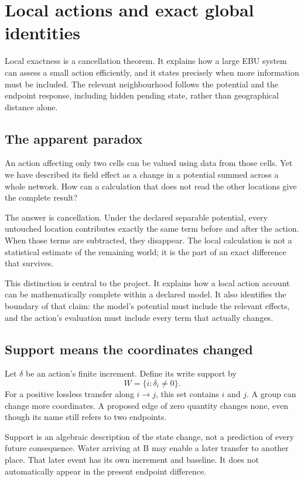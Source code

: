 \chapter{Local actions and exact global identities}\label{ch:locality}

Local exactness is a cancellation theorem. It explains how a large EBU system can assess a small action efficiently, and it states precisely when more information must be included. The relevant neighbourhood follows the potential and the endpoint response, including hidden pending state, rather than geographical distance alone.


\section{The apparent paradox}
An action affecting only two cells can be valued using data from those cells. Yet we have described its field effect as a change in a potential summed across a whole network. How can a calculation that does not read the other locations give the complete result?

The answer is cancellation. Under the declared separable potential, every untouched location contributes exactly the same term before and after the action. When those terms are subtracted, they disappear. The local calculation is not a statistical estimate of the remaining world; it is the part of an exact difference that survives.

This distinction is central to the project. It explains how a local action account can be mathematically complete within a declared model. It also identifies the boundary of that claim: the model's potential must include the relevant effects, and the action's evaluation must include every term that actually changes.

\section{Support means the coordinates changed}
Let $\delta$ be an action's finite increment. Define its write support by
\begin{equation}
 W=\{i:\delta_i\ne0\}.
\end{equation}
For a positive lossless transfer along $i\to j$, this set contains $i$ and $j$. A group can change more coordinates. A proposed edge of zero quantity changes none, even though its name still refers to two endpoints.

Support is an algebraic description of the state change, not a prediction of every future consequence. Water arriving at B may enable a later transfer to another place. That later event has its own increment and baseline. It does not automatically appear in the present endpoint difference.

